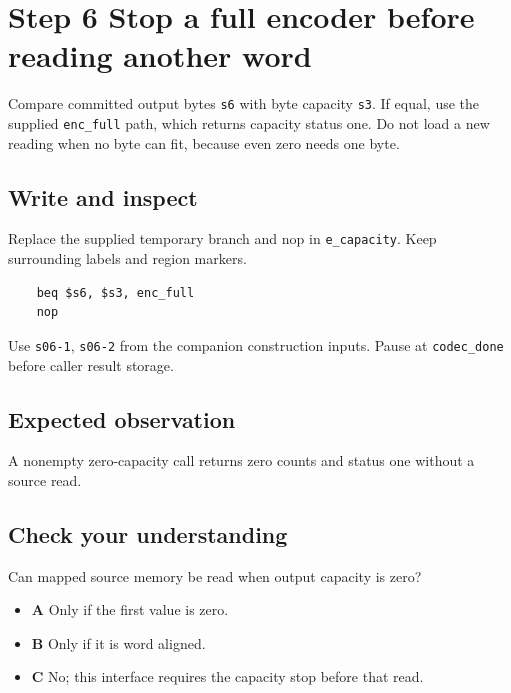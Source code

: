 \section{Step 6 Stop a full encoder before reading another word}\label{delta-s06}

Compare committed output bytes \texttt{s6} with byte capacity \texttt{s3}. If equal, use the supplied \texttt{enc\_full} path, which returns capacity status one. Do not load a new reading when no byte can fit, because even zero needs one byte.

\subsection{Write and inspect}
Replace the supplied temporary branch and nop in \texttt{e\_capacity}. Keep surrounding labels and region markers.

\begin{verbatim}
    beq $s6, $s3, enc_full
    nop
\end{verbatim}
Use \texttt{s06-1}, \texttt{s06-2} from the companion construction inputs. Pause at \texttt{codec\_done} before caller result storage.

\subsection{Expected observation}
A nonempty zero-capacity call returns zero counts and status one without a source read.

\subsection{Check your understanding}
Can mapped source memory be read when output capacity is zero?

\begin{itemize}
  \item \textbf{A} Only if the first value is zero.
  \item \textbf{B} Only if it is word aligned.
  \item \textbf{C} No; this interface requires the capacity stop before that read.
\end{itemize}
